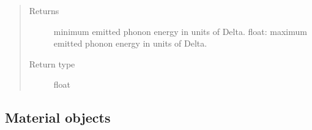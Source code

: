 \documentclass[letterpaper,10pt,english]{sphinxmanual}
\begin{document}
\begin{fulllineitems}
\begin{fulllineitems}
\begin{quote}
\begin{description}
\item[{Returns}] \leavevmode
minimum emitted phonon energy in units of Delta.
float: maximum emitted phonon energy in units of Delta.

\item[{Return type}] \leavevmode
float

\end{description}\end{quote}

\end{fulllineitems}


\end{fulllineitems}



\subsection{Material objects}
\label{\detokenize{code_structure:module-scdc.material}}\label{\detokenize{code_structure:material-objects}}
\end{document}
